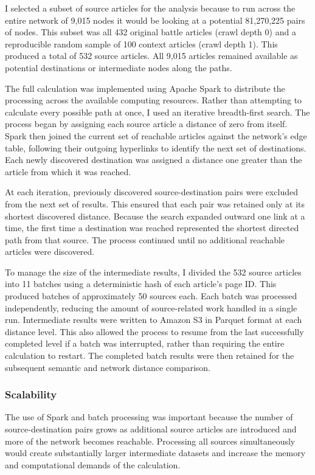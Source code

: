 \documentclass[
  letterpaper,
  DIV=11,
  numbers=noendperiod]{scrartcl}
\begin{document}
I selected a subset of source articles for the analysis because to run
across the entire network of 9,015 nodes it would be looking at a
potential 81,270,225 pairs of nodes. This subset was all 432 original
battle articles (crawl depth 0) and a reproducible random sample of 100
context articles (crawl depth 1). This produced a total of 532 source
articles. All 9,015 articles remained available as potential
destinations or intermediate nodes along the paths.

The full calculation was implemented using Apache Spark to distribute
the processing across the available computing resources. Rather than
attempting to calculate every possible path at once, I used an iterative
breadth-first search. The process began by assigning each source article
a distance of zero from itself. Spark then joined the current set of
reachable articles against the network's edge table, following their
outgoing hyperlinks to identify the next set of destinations. Each newly
discovered destination was assigned a distance one greater than the
article from which it was reached.

At each iteration, previously discovered source-destination pairs were
excluded from the next set of results. This ensured that each pair was
retained only at its shortest discovered distance. Because the search
expanded outward one link at a time, the first time a destination was
reached represented the shortest directed path from that source. The
process continued until no additional reachable articles were
discovered.

To manage the size of the intermediate results, I divided the 532 source
articles into 11 batches using a deterministic hash of each article's
page ID. This produced batches of approximately 50 sources each. Each
batch was processed independently, reducing the amount of source-related
work handled in a single run. Intermediate results were written to
Amazon S3 in Parquet format at each distance level. This also allowed
the process to resume from the last successfully completed level if a
batch was interrupted, rather than requiring the entire calculation to
restart. The completed batch results were then retained for the
subsequent semantic and network distance comparison.

\subsubsection{Scalability}\label{scalability-1}

The use of Spark and batch processing was important because the number
of source-destination pairs grows as additional source articles are
introduced and more of the network becomes reachable. Processing all
sources simultaneously would create substantially larger intermediate
datasets and increase the memory and computational demands of the
calculation.
\end{document}
